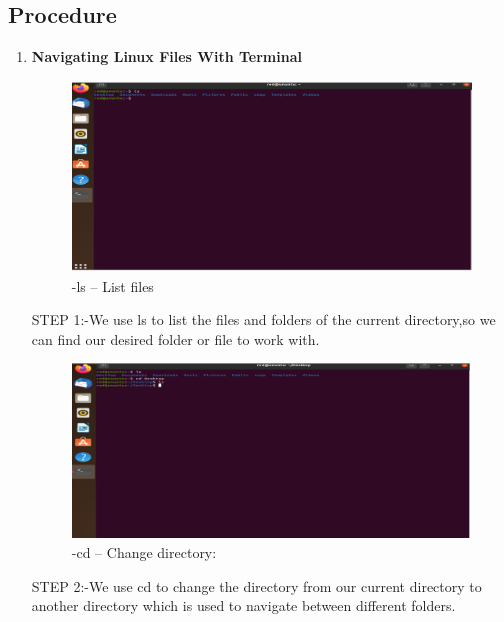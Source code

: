 \documentclass[a4paper,9pt]{article}
\begin{document}
\subsection{Procedure}
\begin{enumerate}
	\item \textbf{Navigating Linux Files With Terminal}
	
	\begin{figure}[H]
		\centering
		\includegraphics[width=0.8\linewidth]{3.1.png}
		\caption{-ls – List files}
	\end{figure}
	STEP 1:-We use ls to list the files and folders of the current directory,so we can find our desired folder or file
	to work with.
	\begin{figure}[H]
		\centering
		\includegraphics[width=0.8\linewidth]{3.2.png}
		\caption{-cd – Change directory:}
	\end{figure}
	STEP 2:-We use cd to change the directory from our current directory to another directory which
	is used to navigate between different folders.
	

\end{enumerate}
\end{document}
